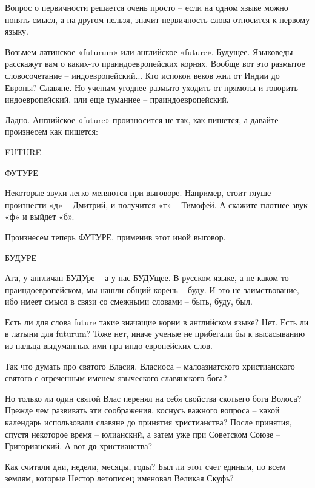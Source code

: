    Вопрос о первичности решается очень просто – если на одном языке можно понять смысл, а на другом нельзя, значит первичность слова относится к первому языку.

   Возьмем латинское «futurum» или английское «future». Будущее. Языковеды расскажут вам о каких-то праиндоевропейских корнях. Вообще вот это размытое словосочетание – индоевропейский... Кто испокон веков жил от Индии до Европы? Славяне. Но ученым угоднее  размыто уходить от прямоты и говорить – индоевропейский, или еще туманнее – праиндоевропейский.

   Ладно. Английское «future» произносится не так, как пишется, а давайте произнесем как пишется:\newline

FUTURE\newline

ФУТУРЕ\newline

   Некоторые звуки легко меняются при выговоре. Например, стоит глуше произнести «д» – Дмитрий, и получится «т» – Тимофей. А скажите плотнее звук «ф» и выйдет «б».

Произнесем теперь ФУТУРЕ, применив этот иной выговор.\newline

БУДУРЕ\newline

Ага, у англичан БУДУре – а у нас БУДУщее. В русском языке, а не каком-то праиндоевропейском, мы нашли общий корень – буду. И это не заимствование, ибо имеет смысл в связи со смежными словами – быть, буду, был.

Есть ли для слова future такие значащие корни в английском языке? Нет. Есть ли в латыни для futurum? Тоже нет, иначе ученые не прибегали бы к высасыванию из пальца выдуманных ими пра-индо-европейских слов.

   Так что думать про святого Власия, Власиоса – малоазиатского христианского святого с огреченным именем языческого славянского бога?

    Но только ли один святой Влас перенял на себя свойства скотьего бога Волоса? Прежде чем развивать эти соображения, коснусь важного вопроса – какой календарь использовали славяне до принятия христианства? После принятия, спустя некоторое время – юлианский, а затем уже при Советском Союзе – Григорианский. А вот \textbf{до} христианства? 

   Как считали дни, недели, месяцы, годы? Был ли этот счет единым, по всем землям, которые Нестор летописец именовал Великая Скуфь? 

